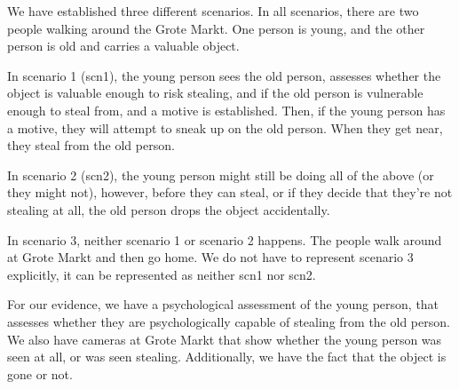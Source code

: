 \documentclass[12pt]{article}
\begin{document}
We have established three different scenarios. In all scenarios, there are two people walking around the Grote Markt. One person is young, and the other person is old and carries a valuable object. 

In scenario 1 (scn1), the young person sees the old person, assesses whether the object is valuable enough to risk stealing, and if the old person is vulnerable enough to steal from, and a motive is established. Then, if the young person has a motive, they will attempt to sneak up on the old person. When they get near, they steal from the old person.

In scenario 2 (scn2), the young person might still be doing all of the above (or they might not), however, before they can steal, or if they decide that they're not stealing at all, the old person drops the object accidentally.

In scenario 3, neither scenario 1 or scenario 2 happens. The people walk around at Grote Markt and then go home. We do not have to represent scenario 3 explicitly, it can be represented as neither scn1 nor scn2.

For our evidence, we have a psychological assessment of the young person, that assesses whether they are psychologically capable of stealing from the old person. We also have cameras at Grote Markt that show whether the young person was seen at all, or was seen stealing. Additionally, we have the fact that the object is gone or not.


\end{document}
